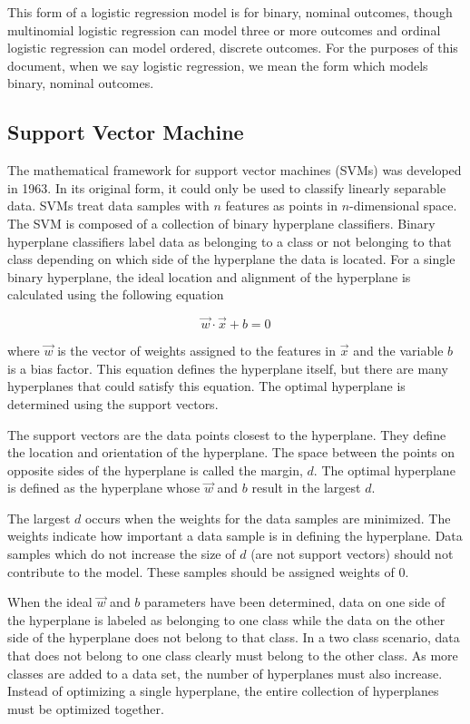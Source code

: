 This form of a logistic regression model is for binary, nominal outcomes, though multinomial logistic regression can model three or more outcomes and ordinal logistic regression can model ordered, discrete outcomes. For the purposes of this document, when we say logistic regression, we mean the form which models binary, nominal outcomes. 


\subsection{Support Vector Machine}

The mathematical framework for support vector machines (SVMs) was developed in 1963. In its original form, it could only be used to classify linearly separable data. SVMs treat data samples with $n$ features as points in $n$-dimensional space. The SVM is composed of a collection of binary hyperplane classifiers. Binary hyperplane classifiers label data as belonging to a class or not belonging to that class depending on which side of the hyperplane the data is located. For a single binary hyperplane, the ideal location and alignment of the hyperplane is calculated using the following equation

\begin{equation}
\vec{w}\cdot\vec{x}+b = 0
\end{equation}

\noindent where $\vec{w}$ is the vector of weights assigned to the features in $\vec{x}$ and the variable $b$ is a bias factor. This equation defines the hyperplane itself, but there are many hyperplanes that could satisfy this equation. The optimal hyperplane is determined using the support vectors. 

The support vectors are the data points closest to the hyperplane. They define the location and orientation of the hyperplane. The space between the points on opposite sides of the hyperplane is called the margin, $d$. The optimal hyperplane is defined as the hyperplane whose $\vec{w}$ and $b$ result in the largest $d$.

The largest $d$ occurs when the weights for the data samples are minimized. The weights indicate how important a data sample is in defining the hyperplane. Data samples which do not increase the size of $d$ (are not support vectors) should not contribute to the model. These samples should be assigned weights of $0$.

When the ideal $\vec{w}$ and $b$ parameters have been determined, data on one side of the hyperplane is labeled as belonging to one class while the data on the other side of the hyperplane does not belong to that class. In a two class scenario, data that does not belong to one class clearly must belong to the other class. As more classes are added to a data set, the number of hyperplanes must also increase. Instead of optimizing a single hyperplane, the entire collection of hyperplanes must be optimized together.

